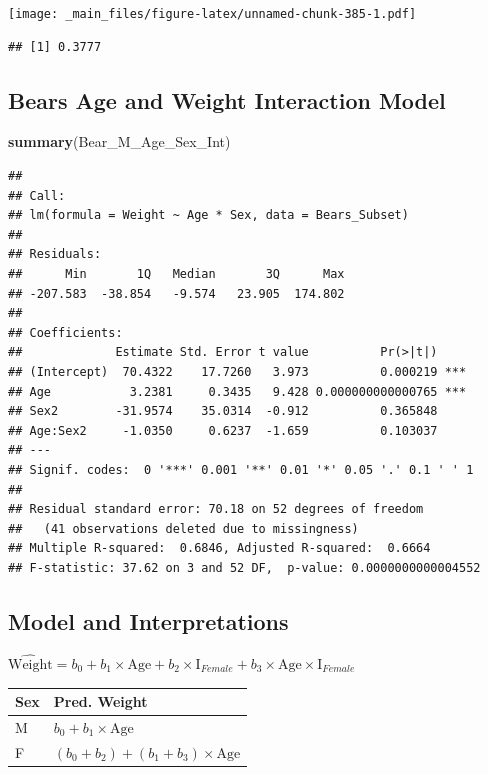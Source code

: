 \documentclass[]{book}
\newenvironment{Shaded}{\begin{snugshade}}{\end{snugshade}}
\newcommand{\KeywordTok}[1]{\textcolor[rgb]{0.13,0.29,0.53}{\textbf{#1}}}
\newcommand{\NormalTok}[1]{#1}
\begin{document}
\texttt{[image: \_main\_files/figure-latex/unnamed-chunk-385-1.pdf]}

\begin{verbatim}
## [1] 0.3777
\end{verbatim}

\subsection{Bears Age and Weight Interaction
Model}\label{bears-age-and-weight-interaction-model}

\begin{Shaded}
\begin{Highlighting}[]
\KeywordTok{summary}\NormalTok{(Bear_M_Age_Sex_Int)}
\end{Highlighting}
\end{Shaded}

\begin{verbatim}
## 
## Call:
## lm(formula = Weight ~ Age * Sex, data = Bears_Subset)
## 
## Residuals:
##      Min       1Q   Median       3Q      Max 
## -207.583  -38.854   -9.574   23.905  174.802 
## 
## Coefficients:
##             Estimate Std. Error t value          Pr(>|t|)    
## (Intercept)  70.4322    17.7260   3.973          0.000219 ***
## Age           3.2381     0.3435   9.428 0.000000000000765 ***
## Sex2        -31.9574    35.0314  -0.912          0.365848    
## Age:Sex2     -1.0350     0.6237  -1.659          0.103037    
## ---
## Signif. codes:  0 '***' 0.001 '**' 0.01 '*' 0.05 '.' 0.1 ' ' 1
## 
## Residual standard error: 70.18 on 52 degrees of freedom
##   (41 observations deleted due to missingness)
## Multiple R-squared:  0.6846, Adjusted R-squared:  0.6664 
## F-statistic: 37.62 on 3 and 52 DF,  p-value: 0.0000000000004552
\end{verbatim}

\subsection{Model and Interpretations}\label{model-and-interpretations}

\(\widehat{\text{Weight}}= b_0+ b_1 \times\text{Age}+ b_2\times\text{I}_{Female} + b_3\times\text{Age}\times\text{I}_{Female}\)

\begin{longtable}[]{@{}ll@{}}
\toprule
Sex & Pred. Weight\tabularnewline
\midrule
\endhead
M & \(b_0 + b_1 \times\text{Age}\)\tabularnewline
F & \((b_0 + b_2) + (b_1 + b_3) \times\text{Age}\)\tabularnewline
\bottomrule
\end{longtable}
\end{document}
